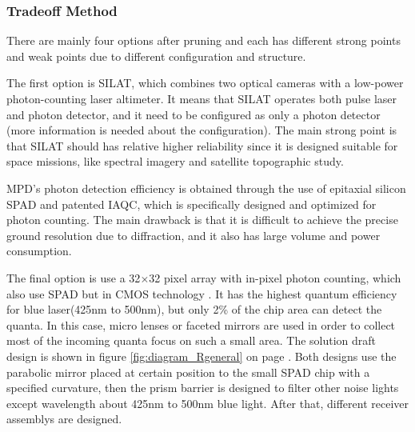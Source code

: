 \subsubsection{Tradeoff Method}
\label{TOReceiverM}
There are mainly four options after pruning and each has different strong points and weak points due to different configuration and structure. 

The first option is \ac{SILAT}, which combines two optical cameras with a low-power photon-counting laser altimeter. It means that \acs{SILAT} operates both pulse laser and photon detector, and it need to be configured as only a photon detector (more information is needed about the configuration). The main strong point is that \acs{SILAT} should has relative higher reliability since it is designed suitable for space missions, like spectral imagery and satellite topographic study. 

\ac{MPD}'s photon detection efficiency is obtained through the use of epitaxial silicon \ac{SPAD} and patented \ac{IAQC}, which is specifically designed and optimized for photon counting. The main drawback is that it is difficult to achieve the precise ground resolution due to diffraction, and it also has large volume and power consumption.

The final option is use a 32$\times$32 pixel array with in-pixel photon counting, which also use \acs{SPAD} but in \ac{CMOS} technology \cite{SPAD}. It has the highest quantum efficiency for blue laser(425nm to 500nm), but only 2\% of the chip area can detect the quanta. In this case, micro lenses or faceted mirrors are used in order to collect most of the incoming quanta focus on such a small area. The solution draft design is shown in figure \ref{fig:diagram_Rgeneral} on page \pageref{fig:diagram_Rgeneral}. Both designs use the parabolic mirror placed at certain position to the small \acs{SPAD} chip with a specified curvature, then the prism barrier is designed to filter other noise lights except wavelength about 425nm to 500nm blue light. After that, different receiver assemblys are designed.

